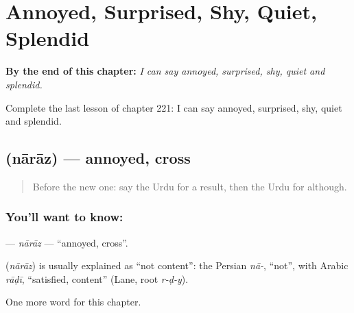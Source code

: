 
\chapter{Annoyed, Surprised, Shy, Quiet, Splendid}
\label{ch:ur-annoyed-surprised-shy-quiet-splendid}

\begin{chapteropening}
\textbf{By the end of this chapter:} \emph{I can say annoyed, surprised, shy, quiet and splendid.}

Complete the last lesson of chapter 221: I can say annoyed, surprised, shy, quiet and splendid.
\end{chapteropening}

\section[\texorpdfstring{\ur{ناراض} (nārāz)}{ناراض (nārāz)}]{ (nārāz) — annoyed, cross}

\label{lesson:UR-C221-naraz}



\begin{quote}
Before the new one: say the Urdu for a result, then the Urdu for although.
\end{quote}

\subsection*{You'll want to know: }
\textbf{} — \emph{nārāz} — \textquotedblleft{}annoyed, cross\textquotedblright{}.

\begin{cousinweb}
\textbf{} (\emph{nārāz}) is usually explained as \textquotedblleft{}not content\textquotedblright{}: the Persian \emph{nā-}, \textquotedblleft{}not\textquotedblright{}, with Arabic \emph{rāḍī}, \textquotedblleft{}satisfied, content\textquotedblright{} (Lane, root \emph{r-ḍ-y}).
\end{cousinweb}

\begin{grammarlens}[title={What you've built}]
One more word for this chapter.
\end{grammarlens}

